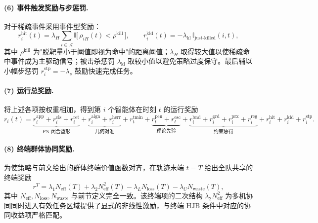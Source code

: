 \paragraph{(6) 事件触发奖励与步惩罚.}
对于稀疏事件采用事件型奖励：
\begin{equation}
r_i^{\mathrm{hit}}(t)=\lambda_H\sum_{i\in\mathcal{A}}\mathbb{I}\bigl[\,\rho_{iH}(t)<\rho^{\mathrm{kill}}\,\bigr],\qquad
r_i^{\mathrm{kld}}(t)=-\lambda_{\mathrm{kl}}\,\mathbb{I}_{\text{just-killed}}(i,t),
\label{eq:r-event}
\end{equation}
其中 $\rho^{\mathrm{kill}}$ 为"脱靶量小于阈值即视为命中"的距离阈值；$\lambda_H$ 取得较大值以使稀疏命中事件成为主驱动信号；被击杀惩罚 $\lambda_{\mathrm{kl}}$ 取较小值以避免策略过度保守。最后辅以小幅步惩罚 $r_i^{\mathrm{stp}}=-\lambda_s$ 鼓励快速完成任务。

\paragraph{(7) 运行总奖励.}
将上述各项按权重相加，得到第 $i$ 个智能体在时刻 $t$ 的运行奖励
\begin{equation}
r_i(t)=
\underbrace{r_i^{\mathrm{app}}+r_i^{\mathrm{cls}}+r_i^{\mathrm{ret}}}_{\text{PN 闭合塑形}}
+\underbrace{r_i^{\mathrm{algn}}+r_i^{\mathrm{herr}}}_{\text{几何对准}}
+r_t^{\mathrm{tmin}}
+\underbrace{r_t^{\mathrm{pen}}+r_t^{\mathrm{esc}}}_{\text{理论先验}}
+\underbrace{r_i^{\mathrm{bnd}}+r_i^{\mathrm{grd}}+r_i^{\mathrm{prx}}+r_i^{\mathrm{reg}}}_{\text{约束惩罚}}
+r_i^{\mathrm{hit}}+r_i^{\mathrm{kld}}+r_i^{\mathrm{stp}}.
\label{eq:r-total}
\end{equation}

\paragraph{(8) 终端群体协同奖励.}
为使策略与前文给出的群体终端价值函数对齐，在轨迹末端 $t=T$ 给出全队共享的终端奖励
\begin{equation}
r^{T}=\lambda_1 N_{\mathrm{eff}}(T)+\lambda_2 N_{\mathrm{eff}}^{2}(T)
-\lambda_L N_{\mathrm{loss}}(T)-\lambda_U N_{\mathrm{waste}}(T),
\label{eq:r-term}
\end{equation}
其中 $N_{\mathrm{eff}},N_{\mathrm{loss}},N_{\mathrm{waste}}$ 与前节定义完全一致。该终端项的二次结构 $\lambda_2 N_{\mathrm{eff}}^{2}$ 为多机协同同时进入有效任务区域提供了显式的非线性激励，与终端 HJB 条件中对应的协同收益项严格匹配。

